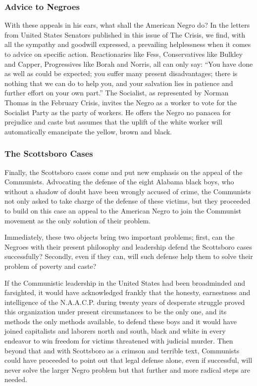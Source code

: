 \documentclass[letterpaper,10pt,english]{jupyterBook}
\begin{document}
\subsubsection{Advice to Negroes}
\label{\detokenize{Volumes/38/09/negro_and_communism:advice-to-negroes}}
\sphinxAtStartPar
With these appeals in his ears, what shall the American Negro do? In the letters from United States Senators published in this issue of The Crisis, we find, with all the sympathy and good\sphinxhyphen{}will expressed, a prevailing helplessness when it comes to advice on specific action. Reactionaries like Fess, Conservatives like Bulkley and Capper, Progressives like Borah and Norris, all can only say: “You have done as well as could be expected; you suffer many present disadvantages; there is nothing that we can do to help you, and your salvation lies in patience and further effort on your own part.” The Socialist, as represented by Norman Thomas in the February Crisis, invites the Negro as a worker to vote for the Socialist Party as the party of workers. He offers the Negro no panacea for prejudice and caste but assumes that the uplift of the white worker will automatically emancipate the yellow, brown and black.


\subsubsection{The Scottsboro Cases}
\label{\detokenize{Volumes/38/09/negro_and_communism:the-scottsboro-cases}}
\sphinxAtStartPar
Finally, the Scottsboro cases come and put new emphasis on the appeal of the Communists. Advocating the defense of the eight Alabama black boys, who without a shadow of doubt have been wrongly accused of crime, the Communists not only asked to take charge of the defense of these victims, but they proceeded to build on this case an appeal to the American Negro to join the Communist movement as the only solution of their problem.

\sphinxAtStartPar
Immediately, these two objects bring two important problems; first, can the Negroes with their present philosophy and leadership defend the Scottsboro cases successfully? Secondly, even if they can, will such defense help them to solve their problem of poverty and caste?

\sphinxAtStartPar
If the Communistic leadership in the United States had been broadminded and far\sphinxhyphen{}sighted, it would have acknowledged frankly that the honesty, earnestness and intelligence of the N.A.A.C.P. during twenty years of desperate struggle proved this organization under present circumstances to be the only one, and its methods the only methods available, to defend these boys and it would have joined capitalists and laborers north and south, black and white in every endeavor to win freedom for victims threatened with judicial murder. Then beyond that and with Scottsboro as a crimson and terrible text, Communists could have proceeded to point out that legal defense alone, even if successful, will never solve the larger Negro problem but that further and more radical steps are needed.
\end{document}
